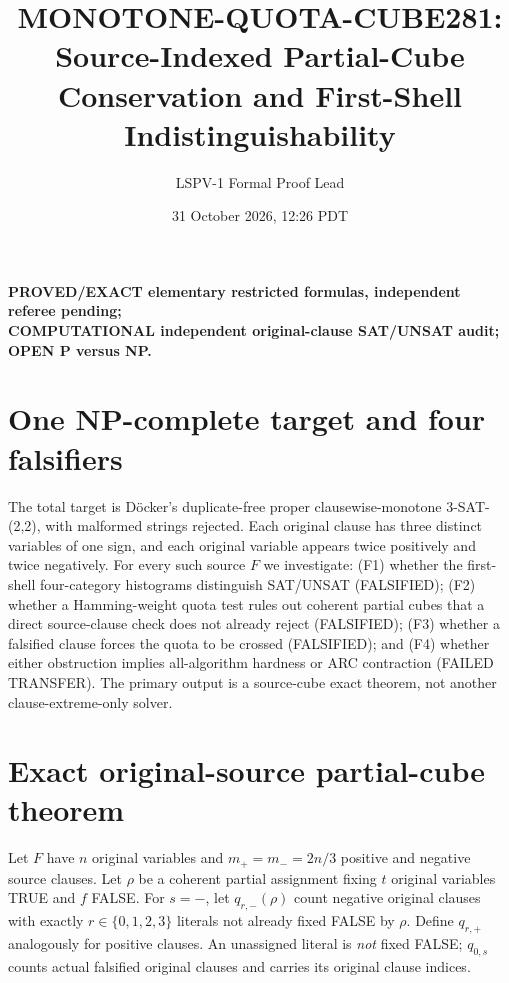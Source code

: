 \documentclass[11pt]{article}
\title{MONOTONE-QUOTA-CUBE281: Source-Indexed Partial-Cube Conservation and First-Shell Indistinguishability}
\author{LSPV-1 Formal Proof Lead}
\date{31 October 2026, 12:26 PDT}
\begin{document}
\maketitle
\begin{center}
\textbf{PROVED/EXACT elementary restricted formulas, independent referee pending;}\\
\textbf{COMPUTATIONAL independent original-clause SAT/UNSAT audit; OPEN P versus NP.}
\end{center}
\section{One NP-complete target and four falsifiers}
The total target is D\"ocker's duplicate-free proper clausewise-monotone
3-SAT-(2,2), with malformed strings rejected. Each original clause has
three distinct variables of one sign, and each original variable
appears twice positively and twice negatively. For every such source $F$
we investigate: (F1) whether the first-shell four-category histograms
distinguish SAT/UNSAT (FALSIFIED); (F2) whether a Hamming-weight quota
test rules out coherent partial cubes that a direct source-clause check
does not already reject (FALSIFIED); (F3) whether a falsified clause forces
the quota to be crossed (FALSIFIED); and (F4) whether either obstruction
implies all-algorithm hardness or ARC contraction (FAILED TRANSFER).
The primary output is a source-cube exact theorem, not another
clause-extreme-only solver.

\section{Exact original-source partial-cube theorem}
Let $F$ have $n$ original variables and $m_+=m_-=2n/3$
positive and negative source clauses. Let $\rho$ be a coherent partial
assignment fixing $t$ original variables TRUE and $f$ FALSE.
For $s=-$, let $q_{r,-}(\rho)$ count negative original clauses with exactly
$r\in\{0,1,2,3\}$ literals not already fixed FALSE by $\rho$.
Define $q_{r,+}$ analogously for positive clauses. An unassigned literal
is \emph{not} fixed FALSE; $q_{0,s}$ counts actual falsified
original clauses and carries its original clause indices.
\end{document}
